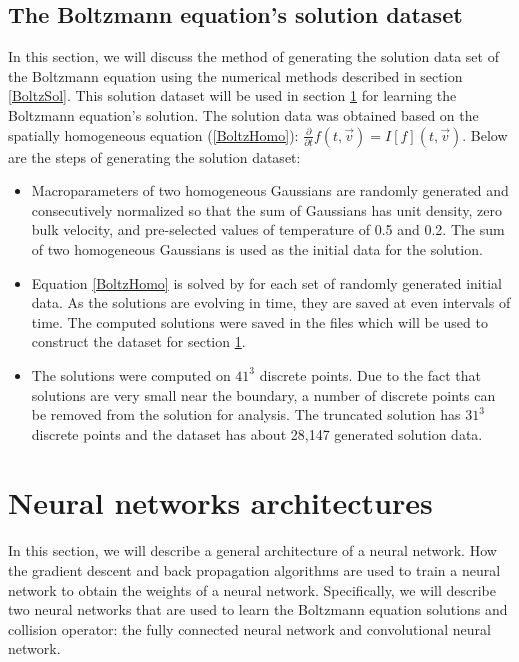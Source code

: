 \documentclass{article}
\begin{document}
\subsection{The Boltzmann equation's solution dataset}
In this section, we will discuss the method of generating the solution data set of the Boltzmann equation using the numerical methods described in section \ref{BoltzSol}. This solution dataset will be used in section \ref{NN} for learning the Boltzmann equation's solution. The solution data was obtained based on the spatially homogeneous equation (\ref{BoltzHomo}): $\frac{\partial}{\partial t}f(t,\vec{v}) = I[f](t, \vec{v})$. Below are the steps of generating the solution dataset:
\begin{itemize}
\item Macroparameters of two homogeneous Gaussians are randomly generated and consecutively normalized so that the sum of Gaussians has unit density, zero bulk velocity, and pre-selected values of temperature of 0.5 and 0.2. The sum of two homogeneous Gaussians is used as the initial data for the solution.
\item Equation \ref{BoltzHomo} is solved by \cite{Alekseenko4} for each set of randomly generated initial data. As the solutions are evolving in time, they are saved at even intervals of time. The computed solutions were saved in the files which will be used to construct the dataset for section \ref{NN}.
\item The solutions were computed on $41^3$ discrete points. Due to the fact that solutions are very small near the boundary, a number of discrete points can be removed from the solution for analysis. The truncated solution has $31^3$ discrete points and the dataset has about 28,147  generated solution data.
 
\end{itemize}

\section{Neural networks architectures} \label{NN}
In this section, we will describe a general architecture of a neural network. How the gradient descent and back propagation algorithms are used to train a neural network to obtain the weights of a neural network. Specifically, we will describe two neural networks that are used to learn the Boltzmann equation solutions and collision operator: the fully connected neural network and convolutional neural network.
\end{document}
